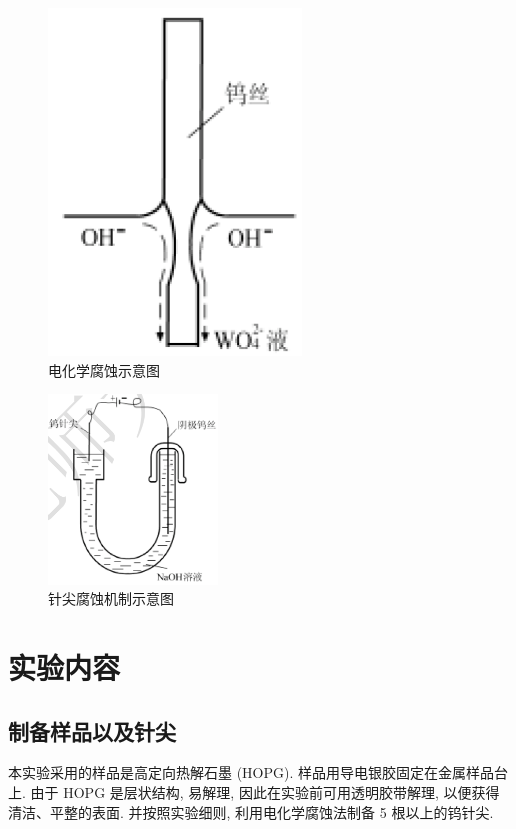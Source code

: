 \documentclass[12pt]{ctexart} %
\begin{document}
\begin{figure}[htbp] %
 \centering
 \includegraphics[width=0.6\textwidth]{FIG1.png} %
 \caption{电化学腐蚀示意图}
 \label{fig:etching_setup}
\end{figure}

\begin{figure}[htbp]
 \centering
 \includegraphics[width=0.4\textwidth]{FIG2.png} %
 \caption{针尖腐蚀机制示意图}
 \label{fig:etching_mechanism}
\end{figure}

\section{实验内容}
\subsection{制备样品以及针尖}
本实验采用的样品是高定向热解石墨 (HOPG). 样品用导电银胶固定在金属样品台上. 由于 HOPG 是层状结构, 易解理, 因此在实验前可用透明胶带解理, 以便获得清洁、平整的表面.
并按照实验细则, 利用电化学腐蚀法制备 5 根以上的钨针尖.
\end{document}
